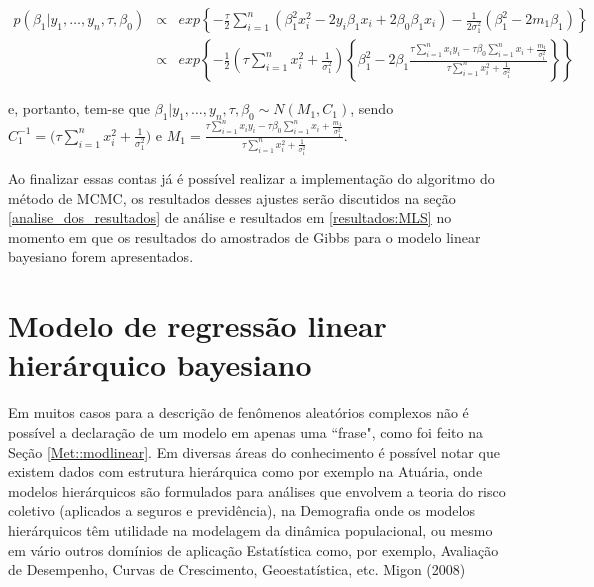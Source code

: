 \documentclass[12pt,a4paper,header]{abnt}
\begin{document}
\begin{eqnarray*}
p(\beta_1 | y_1,\ldots,y_n,\tau, \beta_0) &\propto& exp \left\{ -\frac{\tau}{2} \sum^n_{i=1} (\beta_1^2x_i^2 - 2y_i\beta_1x_i +2\beta_0\beta_1x_i) - \frac{1}{2\sigma_1^2}(\beta_1^2-2m_1\beta_1)  \right\} \nonumber \\
&\propto& exp \left\{-\frac{1}{2} ( \tau \sum^n_{i=1}x_i^2 + \frac{1}{\sigma_1^2}) \left\{
\beta_1^2 -2\beta_1 \frac{\tau\sum^n_{i=1}x_i y_i  - \tau\beta_0\sum^n_{i=1}x_i + \frac{m_1}{\sigma_1^2}}{\tau \sum^n_{i=1}x_i^2 + \frac{1}{\sigma_1^2}}    \right\}    \right\}
\end{eqnarray*}

e, portanto, tem-se que $\beta_1 | y_1,\ldots,y_n , \tau,\beta_0 \sim N(M_1, C_1)$, sendo $C_1^{-1}= \Big( \tau \sum^n_{i=1}x_i^2 + \frac{1}{\sigma_1^2} \Big)$ e $M_1=\frac{\tau\sum^n_{i=1}x_i y_i  - \tau\beta_0\sum^n_{i=1}x_i + \frac{m_1}{\sigma_1^2}}{\tau \sum^n_{i=1}x_i^2 + \frac{1}{\sigma_1^2}}$.

Ao finalizar essas contas já é possível realizar a implementação do algoritmo do método de \ac{MCMC}, os resultados desses ajustes serão discutidos na seção \ref{analise_dos_resultados} de análise e resultados em \ref{resultados:MLS} no momento em que os resultados do amostrados de Gibbs para o modelo linear bayesiano forem apresentados.





\section{Modelo de regressão linear hierárquico bayesiano} \label{Met::modlinearhier}

Em muitos casos para a descrição de fenômenos aleatórios complexos não é possível a declaração de um modelo em apenas uma ``frase", como foi feito na Seção \ref{Met::modlinear}. Em diversas áreas do conhecimento é possível notar que existem dados com estrutura hierárquica como por exemplo na Atuária, onde modelos hierárquicos são formulados para análises que envolvem a teoria do risco coletivo (aplicados a seguros e previdência), na Demografia onde os modelos hierárquicos têm utilidade na modelagem da dinâmica populacional, ou mesmo em vário outros domínios de aplicação Estatística como, por exemplo, Avaliação de Desempenho, Curvas de Crescimento, Geoestatística, etc. Migon (2008) \cite{MigonMH}
\end{document}
